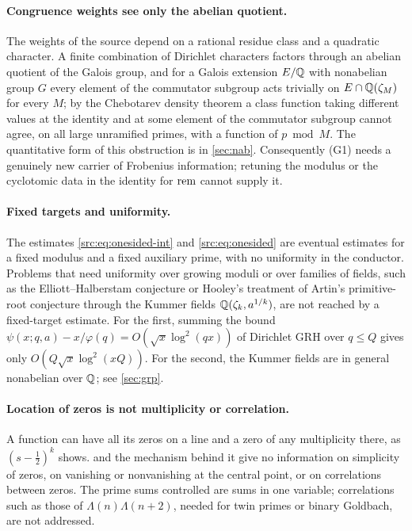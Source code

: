 \paragraph{Congruence weights see only the abelian quotient.}
The weights of the source depend on a rational residue class and a quadratic character. A
finite combination of Dirichlet characters factors through an abelian quotient of the Galois
group, and for a Galois extension $E/\mathbb{Q}$ with nonabelian group $G$ every element of the
commutator subgroup acts trivially on $E\cap\mathbb{Q}(\zeta_M)$ for every $M$; by the Chebotarev
density theorem a class function taking different values at the identity and at some element
of the commutator subgroup cannot agree, on all large unramified primes, with a function of
$p\bmod M$. The quantitative form of this obstruction is in \cref{sec:nab}. Consequently (G1)
needs a genuinely new carrier of Frobenius information; retuning the modulus or the
cyclotomic data in the identity for $\mathrm{rem}$ cannot supply it.

\paragraph{Fixed targets and uniformity.}
The estimates \eqref{src:eq:onesided-int} and \eqref{src:eq:onesided} are eventual estimates
for a fixed modulus and a fixed auxiliary prime, with no uniformity in the conductor. Problems
that need uniformity over growing moduli or over families of fields, such as the
Elliott--Halberstam conjecture or Hooley's treatment of Artin's primitive-root conjecture
through the Kummer fields $\mathbb{Q}(\zeta_k,a^{1/k})$, are not reached by a fixed-target estimate.
For the first, summing the bound
$\psi(x;q,a)-x/\varphi(q)=O(\sqrt x\log^2(qx))$ of Dirichlet GRH over $q\le Q$ gives only
$O(Q\sqrt x\log^2(xQ))$. For the second, the Kummer fields are in general nonabelian over $\mathbb{Q}$;
see \cref{sec:grp}.

\paragraph{Location of zeros is not multiplicity or correlation.}
A function can have all its zeros on a line and a zero of any multiplicity there, as
$(s-\tfrac12)^k$ shows.  and the mechanism behind it give no information on
simplicity of zeros, on vanishing or nonvanishing at the central point, or on correlations
between zeros. The prime sums controlled are sums in one variable; correlations such as those
of $\Lambda(n)\Lambda(n+2)$, needed for twin primes or binary Goldbach, are not addressed.

